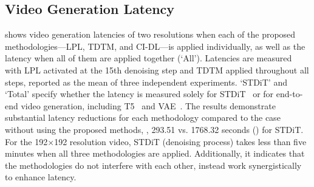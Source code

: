 



\subsection{Video Generation Latency}

 shows video generation latencies of two resolutions when each of the proposed methodologies—LPL, TDTM, and CI-DL—is applied individually, as well as the latency when all of them are applied together (`All'). Latencies are measured with LPL activated at the 15th denoising step and TDTM applied throughout all steps, reported as the mean of three independent experiments. `STDiT' and `Total' specify whether the latency is measured solely for STDiT~\cite{opensora} or for end-to-end video generation, including T5~\cite{raffel2020exploring} and VAE~\cite{doersch2016tutorial}. The results demonstrate substantial latency reductions for each methodology compared to the case without using the proposed methods, \ie, 293.51 vs. 1768.32 seconds () for STDiT. For the 192$\times$192 resolution video, STDiT (denoising process) takes less than five minutes when all three methodologies are applied. Additionally, it indicates that the methodologies do not interfere with each other, instead work synergistically to enhance latency.



